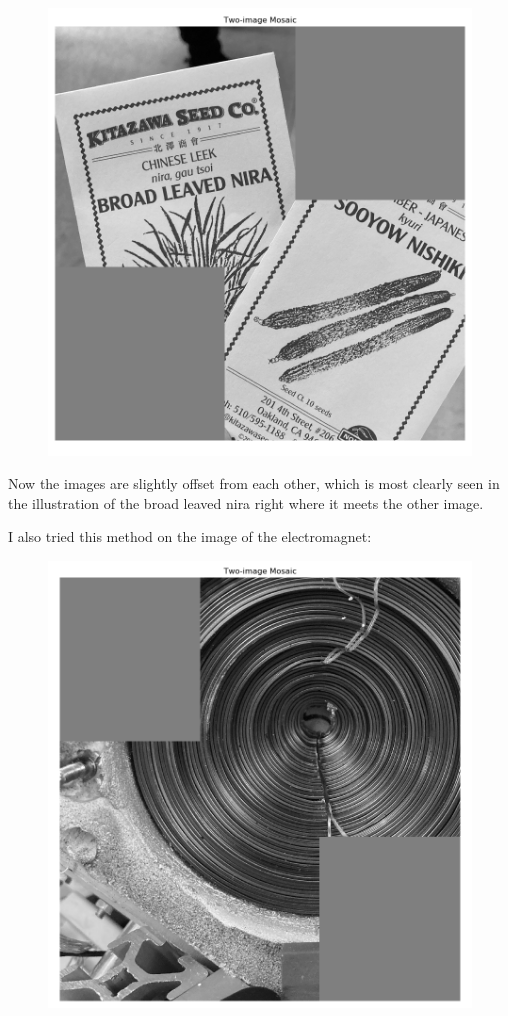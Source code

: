 \documentclass[]{article}
\begin{document}
\begin{figure}[H]
	\centering
	\includegraphics[width=6.5in]{p3_output/img_3_mosaic_lp.png}
\end{figure}
Now the images are slightly offset from each other, which is most clearly seen in the illustration of the broad leaved nira right where it meets the other image.

I also tried this method on the image of the electromagnet:

\begin{figure}[H]
	\centering
	\includegraphics[width=6.5in]{p3_output/img_1_mosaic_lp.png}
\end{figure}
\end{document}
